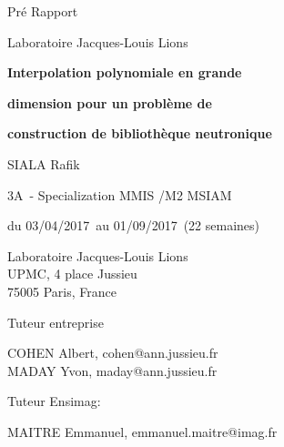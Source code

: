 \documentclass[12pt,a4paper]{report}
\makeatletter
\newcommand{\organizationName}{Laboratoire Jacques-Louis Lions}                                                                       %
\newcommand{\organizationAdress}{Laboratoire Jacques-Louis Lions \\ UPMC, 4 place Jussieu \\ 75005 Paris, France}                     %
\newcommand{\internshipTitlePartOne}{Interpolation polynomiale en grande}                                                          %
\newcommand{\internshipTitlePartTwo}{dimension pour un problème de}                                                                   %
\newcommand{\internshipTitlePartThree}{construction de bibliothèque neutronique}                                                                    %
\newcommand{\authorName}{SIALA Rafik}                                                                                                 %
\newcommand{\classYear}{3A}                                                                                                           %
\newcommand{\specialization}{MMIS /M2 MSIAM}                                                                                          %
\newcommand{\startDate}{03/04/2017}                                                                                                   %
\newcommand{\varendDate}{01/09/2017}                                                                                                  %
\newcommand{\duration}{22 semaines}                                                                                                   %
\newcommand{\internshipSupervisor}{ COHEN Albert, cohen@ann.jussieu.fr \\ MADAY Yvon, maday@ann.jussieu.fr  }                         %
\newcommand{\reviewerName}{ MAITRE Emmanuel, emmanuel.maitre@imag.fr}                                                                 %
\newcommand{\grayIntensity}{25}
\makeatother
\begin{document}
\begin{titlepage}
	\vspace{1.5cm}

	{Pré Rapport \par}

	\vspace{1.5cm}

	{\large\organizationName\par}

	\vspace{1.5cm}

  {\huge\bfseries\colorbox{gray!\grayIntensity}{\internshipTitlePartOne}\par}
  {\huge\bfseries\colorbox{gray!\grayIntensity}{\internshipTitlePartTwo}\par}
  {\huge\bfseries\colorbox{gray!\grayIntensity}{\internshipTitlePartThree}\par}

	\vspace{2cm}

	{\large\authorName\par}

	\vspace{0.5cm}

	{\large\classYear\ - Specialization \specialization\par}

	\vspace{1cm}

	{\normalsize du \startDate\ au \varendDate\ (\duration)\par}

    \vfill

    \begin{minipage}[t]{7cm}
        \flushleft


        \organizationAdress
    \end{minipage}
    \hfill
    \begin{minipage}[t]{7cm}
        \flushright
        \footnotesize Tuteur entreprise

        \internshipSupervisor

        \footnotesize Tuteur Ensimag:

        \reviewerName


    \end{minipage}

\end{titlepage}
\newpage
\tableofcontents
\newpage
\end{document}
